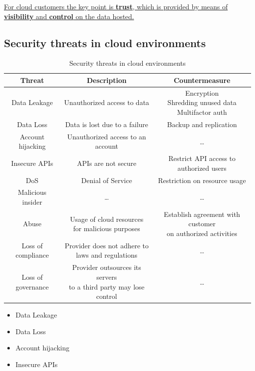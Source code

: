 \begin{center}
   \ul{For cloud customers the key point is \textbf{trust}, which is provided by means of \textbf{visibility} and \textbf{control} on the data hosted.}
\end{center}

\subsection{Security threats in cloud environments}
\begin{table}[htbp]
   \centering
   \begin{tabular}{|c|c|c|}
      \hline
      \textbf{Threat} & \textbf{Description} & \textbf{Countermeasure} \\
      \hline
      Data Leakage & Unauthorized access to data & \shortstack{
         Encryption\\
         Shredding unused data\\
         Multifactor auth
      } \\
      \hline
      Data Loss & Data is lost due to a failure & Backup and replication \\
      \hline
      Account hijacking & Unauthorized access to an account & \dots\\
      \hline
      Insecure APIs & APIs are not secure & \shortstack{Restrict API access to\\ authorized users}\\
      \hline
      DoS & Denial of Service & Restriction on resource usage\\
      \hline
      Malicious insider & \dots & \dots \\
      \hline
      Abuse & \shortstack{Usage of cloud resources\\ for malicious purposes} & \shortstack{Establish agreement with customer\\ on authorized activities} \\
      \hline
      Loss of compliance & \shortstack{Provider does not adhere to\\ laws and regulations} & \dots \\
      \hline
      Loss of governance & \shortstack{Provider outsources its servers \\to a third party may lose control} & \dots \\
      \hline
      
   \end{tabular}
   \caption{Security threats in cloud environments}
   \label{tab:securitythreats_cloud}
\end{table}
\begin{itemize}
   \item Data Leakage
   \item Data Loss
   \item Account hijacking
   \item Insecure APIs
\end{itemize}

